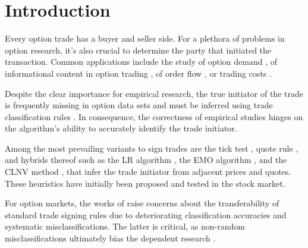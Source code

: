 \section{Introduction}\label{sec:introduction}

Every option trade has a buyer and seller side. For a plethora of problems in option research, it’s also crucial to determine the party that initiated the transaction. Common applications include the study of option demand \autocite[\checkmark][4261]{garleanuDemandBasedOptionPricing2009}, of informational content in option trading \autocites[\checkmark][631]{huDoesOptionTrading2014}[\checkmark][882]{panInformationOptionVolume2006}[\checkmark][1079]{caoInformationalContentOption2005}, of order flow \autocite[\checkmark][684]{muravyevOrderFlowExpected2016}, or trading costs \autocite[\checkmark][4980]{muravyevOptionsTradingCosts2020}. 

Despite the clear importance for empirical research, the true initiator of the trade is frequently missing in option data sets and must be inferred using trade classification rules \autocite[\checkmark][453]{easleyOptionVolumeStock1998}. In consequence, the correctness of empirical studies hinges on the algorithm's ability to accurately identify the trade initiator.

Among the most prevailing variants to sign trades are the tick test \autocite[\checkmark][240]{hasbrouckTradesQuotesInventories1988}, quote rule \autocite[\checkmark][41]{harrisDayEndTransactionPrice1989}, and hybrids thereof such as the \gls{LR} algorithm \autocite[\checkmark][745]{leeInferringTradeDirection1991}, the \gls{EMO} algorithm \autocite[\checkmark][536]{ellisAccuracyTradeClassification2000}, and the \gls{CLNV} method \autocite[\checkmark][3812]{chakrabartyTradeClassificationAlgorithms2007}, that infer the trade initiator from adjacent prices and quotes. These heuristics have initially been proposed and tested in the stock market.

For option markets, the works of \textcites[\checkmark][11--13]{grauerOptionTradeClassification2022}[\checkmark][887--891]{savickasInferringDirectionOption2003} raise concerns about the transferability of standard trade signing rules due to deteriorating classification accuracies and systematic misclassifications. The latter is critical, as non-random misclassifications ultimately bias the dependent research \autocites[\checkmark][260]{odders-whiteOccurrenceConsequencesInaccurate2000}[\checkmark][157]{theissenTestAccuracyLee2001}.

